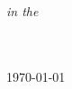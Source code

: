 \documentclass[
11pt, %
english, %
singlespacing, %
headsepline, %
]{MastersDoctoralThesis} %
\begin{document}
\begin{titlepage}
\begin{center}
\textit{in the}\\[0.4cm]
\groupname\\\deptname\\[2cm] %

\vfill

{\large \today}\\[4cm] %
 
\vfill
\end{center}
\end{titlepage}



 
 
\end{document}
